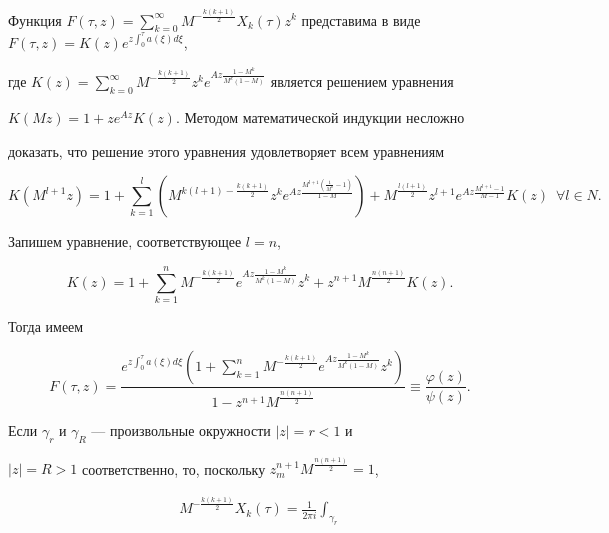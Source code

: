 


\begin{pf} 


Функция $F(\tau,z)=\sum\limits^\infty_{k=0} M^{-\frac{k(k+1)}{2}} 


X_k(\tau)z^k$ представима в виде $F(\tau,z)=K(z) e^{z\int^\tau_0 


a(\xi)d\xi}$, 


где $K(z)=\sum\limits^\infty_{k=0}M^{-\frac{k(k+1)}{2}}z^k 


e^{Az\frac{1-M^k}{M^k(1-M)}}$ является решением уравнения 


$K(Mz)=1+z e^{Az}K(z)$. Методом математической индукции несложно 


доказать, что решение этого уравнения удовлетворяет всем уравнениям 


$$ 


K(M^{l+1}z)=1+\sum^l_{k=1}(M^{k(l+1)-\frac{k(k+1)}{2}} 


z^k e^{Az\frac{M^{l+1}(\frac{1}{M^k}-1)}{1-M}}) 


+M^{\frac{l(l+1)}{2}}z^{l+1} 


e^{Az\frac{M^{l+1}-1}{M-1}}K(z)\ \; \forall l\in N. 


$$ 


Запишем уравнение, соответствующее $l=n$, 


$$ 


K(z)=1+\sum^n_{k=1}M^{-\frac{k(k+1)}{2}} 


e^{Az\frac{1-M^k}{M^k(1-M)}}z^k+z^{n+1}M^{\frac{n(n+1)}{2}}K(z). 


$$ 


Тогда имеем 


$$ 


F(\tau,z)=\frac{e^{z\int^\tau_0 a(\xi)d\xi}


\left(1+\sum\limits^n_{k=1}M^{-\frac{k(k+1)}{2}} 


e^{Az\frac{1-M^k}{M^k(1-M)}}z^k\right)} 


{1-z^{n+1}M^{\frac{n(n+1)}{2}}}\equiv\frac{\varphi(z)}{\psi(z)}. 


$$ 


Если $\gamma_r$ и $\gamma_R$ --- произвольные окружности $|z|{=}r<1$ и 


$|z|{=}R>1$ соответственно, то, поскольку $z^{n+1}_m M^{\frac{n(n+1)}{2}}=1$, 


\begin{multline} 


M^{-\frac{k(k+1)}{2}} X_k(\tau)=\frac{1}{2\pi i}\int_{\gamma_r} 



\end{multline}
\end{pf}
